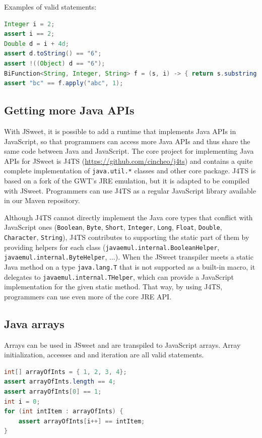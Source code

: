 \documentclass[a4paper]{report}
\begin{document}
\noindent
Examples of valid statements:

\begin{lstlisting}[language=Java]
Integer i = 2;
assert i == 2;
Double d = i + 4d;
assert d.toString() == "6";
assert !((Object) d == "6");
BiFunction<String, Integer, String> f = (s, i) -> { return s.substring(i); };
assert "bc" == f.apply("abc", 1);
\end{lstlisting}

\subsection{Getting more Java APIs}

With JSweet, it is possible to add a runtime that implements Java APIs in JavaScript, so that programmers can access more Java APIs and thus share the same code between Java and JavaScript. The core project for implementing Java APIs for JSweet is J4TS (\url{https://github.com/cincheo/j4ts}) and contains a quite complete implementation of \texttt{java.util.*} classes and other core package. J4TS is based on a fork of the GWT's JRE emulation, but it is adapted to be compiled with JSweet. Programmers can use J4TS as a regular JavaScript library available in our Maven repository.

Although J4TS cannot directly implement the Java core types that conflict with JavaScript ones (\texttt{Boolean}, \texttt{Byte}, \texttt{Short}, \texttt{Integer}, \texttt{Long}, \texttt{Float}, \texttt{Double}, \texttt{Character}, \texttt{String}), J4TS contributes to supporting the static part of them by providing helpers for each class (\texttt{javaemul.internal.BooleanHelper}, \texttt{javaemul.internal.ByteHelper}, ...). When the JSweet transpiler meets a static Java method on a type \texttt{java.lang.T} that is not supported as a built-in macro, it delegates to \texttt{javaemul.internal.THelper}, which can provide a JavaScript implementation for the given static method. That way, by using J4TS, programmers can use even more of the core JRE API.

\subsection{Java arrays}

Arrays can be used in JSweet and are transpiled to JavaScript arrays. Array initialization, accesses and and iteration are all valid statements.

\begin{lstlisting}[language=Java]
int[] arrayOfInts = { 1, 2, 3, 4};
assert arrayOfInts.length == 4;  
assert arrayOfInts[0] == 1;
int i = 0;
for (int intItem : arrayOfInts) { 
	assert arrayOfInts[i++] == intItem;
}
\end{lstlisting}
\end{document}
